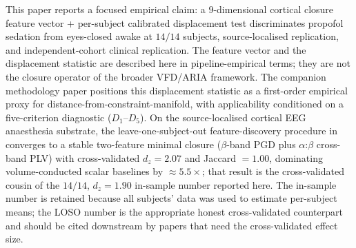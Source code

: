\documentclass[11pt,a4paper]{article}
\begin{document}
This paper reports a focused empirical claim: a $9$-dimensional cortical closure feature vector + per-subject calibrated displacement test discriminates propofol sedation from eyes-closed awake at $14/14$ subjects, source-localised replication, and independent-cohort clinical replication. The feature vector and the displacement statistic are described here in pipeline-empirical terms; they are not the closure operator of the broader VFD/ARIA framework. The companion methodology paper \citep{SmartClosureDistance} positions this displacement statistic as a first-order empirical proxy for distance-from-constraint-manifold, with applicability conditioned on a five-criterion diagnostic ($D_1$--$D_5$). On the source-localised cortical EEG anaesthesia substrate, the leave-one-subject-out feature-discovery procedure in \citep{SmartClosureDistance} converges to a stable two-feature minimal closure ($\beta$-band PGD plus $\alpha$:$\beta$ cross-band PLV) with cross-validated $d_z = 2.07$ and Jaccard $= 1.00$, dominating volume-conducted scalar baselines by $\approx 5.5\times$; that result is the cross-validated cousin of the $14/14$, $d_z = 1.90$ in-sample number reported here. The in-sample number is retained because all subjects' data was used to estimate per-subject means; the LOSO number is the appropriate honest cross-validated counterpart and should be cited downstream by papers that need the cross-validated effect size.
\end{document}

